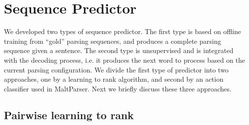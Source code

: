 \section{Sequence Predictor}
We developed two types of sequence predictor. The first type is based on
offline training from ``gold'' parsing sequences, and produces a complete
parsing sequence given a sentence. The second type is unsupervised and is
integrated with the decoding process, i.e. it produces the next word to
process based on the current parsing configuration.
We divide the first type of predictor into two approaches, one by a learning
to rank algorithm, and second by an action classifier used in MaltParser.
Next we briefly discuss these three approaches.

%

\subsection{Pairwise learning to rank}


